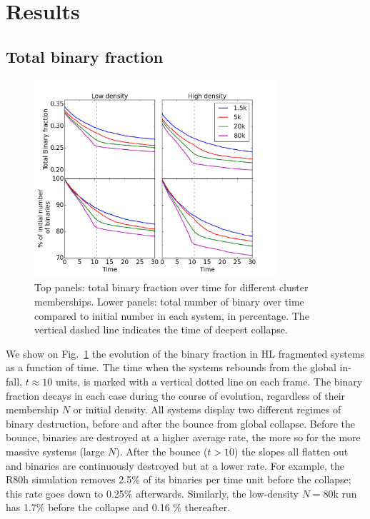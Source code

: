 \section{Results}


\subsection{Total binary fraction}



\begin{figure}
\begin{center}
\includegraphics[width=0.8\textwidth]{Figures/6_TotBinFrac_vs_time}
\caption{ Top panels: total binary fraction over time for different cluster memberships. Lower panels: total number of binary over time compared to initial number in each system, in percentage. The vertical dashed line indicates the time of deepest collapse.  }
\label{Fig:6_TotBinFrac}
\end{center}
\end{figure}

We show on Fig.~\ref{Fig:6_TotBinFrac} the evolution of the binary fraction in HL fragmented systems as a function of time. The time when the systems rebounds from the global in-fall, $t \approx 10$ units, is marked with a vertical dotted line on each frame. The binary fraction decays in each case during the course of evolution, regardless of their membership $N$ or initial density. 
All systems display two different regimes of binary destruction, before and after the bounce from global collapse. Before the bounce, binaries are destroyed at a higher average rate, the more so for the more massive systems (large $N$). 
After the bounce ($t > 10$) the slopes all flatten out and binaries are continuously destroyed but at a lower rate. For example, the R80h simulation removes 2.5\% of its binaries per time unit before the collapse; this rate goes down to 0.25\% afterwards. Similarly, the low-density $N = 80$k run has  1.7\% before the collapse and 0.16 \% thereafter.


